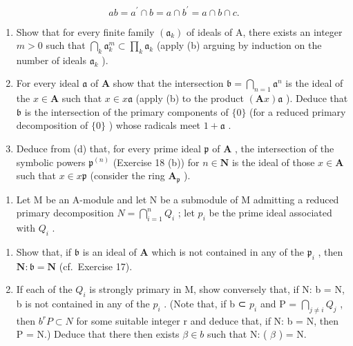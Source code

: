 \[
a b = a ^ {\prime} \cap b = a \cap b ^ {\prime} = a \cap b \cap c.
\]

\begin{enumerate}
\def\labelenumi{(\alph{enumi})}
\setcounter{enumi}{2}
\item
  Show that for every finite family \((\mathfrak{a}_k)\) of ideals of A, there exists an integer \(m > 0\) such that \(\bigcap_{k} \mathfrak{a}_k^m \subset \prod_{k} \mathfrak{a}_k\) (apply (b) arguing by induction on the number of ideals \(\mathfrak{a}_k\) ).
\item
  For every ideal \(\mathfrak{a}\) of \(\mathbf{A}\) show that the intersection \(\mathfrak{b} = \bigcap_{n=1} \mathfrak{a}^n\) is the ideal of the \(x \in \mathbf{A}\) such that \(x \in x\mathfrak{a}\) (apply (b) to the product \((\mathbf{A}x)\mathfrak{a}\) ). Deduce that \(\mathfrak{b}\) is the intersection of the primary components of \(\{0\}\) (for a reduced primary decomposition of \(\{0\}\) ) whose radicals meet \(1 + \mathfrak{a}\) .
\item
  Deduce from (d) that, for every prime ideal \(\mathfrak{p}\) of \(\mathbf{A}\) , the intersection of the symbolic powers \(\mathfrak{p}^{(n)}\) (Exercise 18 (b)) for \(n\in\mathbf{N}\) is the ideal of those \(x\in\mathbf{A}\) such that \(x\in x\mathfrak{p}\) (consider the ring \(\mathbf{A}_{\mathfrak{p}}\) ).
\end{enumerate}

\begin{enumerate}
\def\labelenumi{\arabic{enumi}.}
\setcounter{enumi}{29}
\tightlist
\item
  Let M be an A-module and let N be a submodule of M admitting a reduced primary decomposition \(N = \bigcap_{i=1}^{n} Q_{i}\) ; let \(p_{i}\) be the prime ideal associated with \(Q_{i}\) .
\end{enumerate}

\begin{enumerate}
\def\labelenumi{(\alph{enumi})}
\item
  Show that, if \(\mathfrak{b}\) is an ideal of \(\mathbf{A}\) which is not contained in any of the \(\mathfrak{p}_i\) , then \(\mathbf{N}:\mathfrak{b} = \mathbf{N}\) (cf.~Exercise 17).
\item
  If each of the \(Q_{i}\) is strongly primary in M, show conversely that, if N: b = N, b is not contained in any of the \(p_{i}\) . (Note that, if b ⊂ \(p_{i}\) and P = \(\bigcap_{j \neq i} Q_{j}\) , then \(b^rP \subset N\) for some suitable integer r and deduce that, if N: b = N, then P = N.) Deduce that there then exists \(\beta \in b\) such that N: ( \(\beta\) ) = N.
\end{enumerate}

